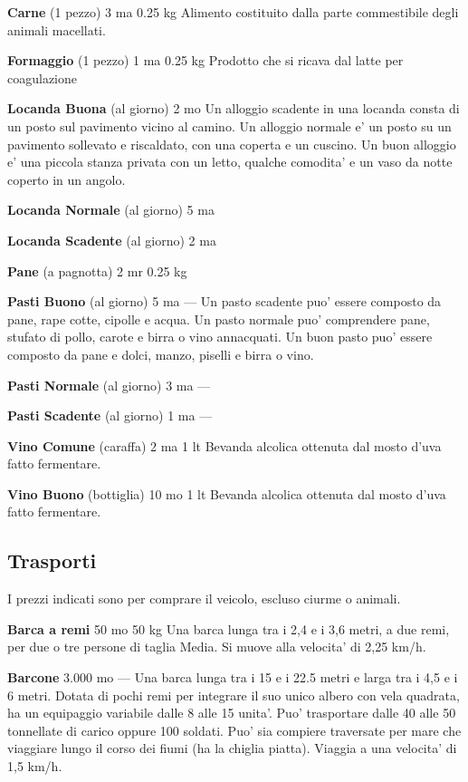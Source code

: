 \documentclass[a4paper,11pt,twoside,openany]{dndbook}
\begin{document}
{\textbf{Carne} (1 pezzo) 3 ma 0.25 kg Alimento costituito dalla parte commestibile degli animali macellati.

\textbf{Formaggio} (1 pezzo) 1 ma 0.25 kg Prodotto che si ricava dal latte per coagulazione

\textbf{Locanda Buona} (al giorno) 2 mo Un alloggio scadente in una locanda consta di un posto sul pavimento vicino al camino. Un alloggio normale e' un posto su un pavimento sollevato e riscaldato, con una coperta e un cuscino. Un buon alloggio e' una piccola stanza privata con un letto, qualche comodita' e un vaso da notte coperto in un angolo.

\textbf{Locanda Normale} (al giorno) 5 ma

\textbf{Locanda Scadente} (al giorno) 2 ma 

\textbf{Pane} (a pagnotta) 2 mr 0.25 kg

\textbf{Pasti Buono} (al giorno) 5 ma --- Un pasto scadente puo' essere composto da pane, rape cotte, cipolle e acqua. Un pasto normale puo' comprendere pane, stufato di pollo, carote e birra o vino annacquati. Un buon pasto puo' essere composto da pane e dolci, manzo, piselli e birra o vino.

\textbf{Pasti Normale} (al giorno) 3 ma ---

\textbf{Pasti Scadente} (al giorno) 1 ma ---

\textbf{Vino Comune} (caraffa) 2 ma 1 lt Bevanda alcolica ottenuta dal mosto d'uva fatto fermentare.

\textbf{Vino Buono} (bottiglia) 10 mo 1 lt Bevanda alcolica ottenuta dal mosto d'uva fatto fermentare.

\pagebreak

\subsection{Trasporti}

\label{trasporti}

I prezzi indicati sono per comprare il veicolo, escluso ciurme o animali.

\textbf{Barca a remi} 50 mo 50 kg Una barca lunga tra i 2,4 e i 3,6 metri, a due remi, per due o tre persone di taglia Media. Si muove alla velocita' di 2,25 km/h.

\textbf{Barcone} 3.000 mo --- Una barca lunga tra i 15 e i 22.5 metri e larga tra i 4,5 e i 6 metri. Dotata di pochi remi per integrare il suo unico albero con vela quadrata, ha un equipaggio variabile dalle 8 alle 15 unita'. Puo' trasportare dalle 40 alle 50 tonnellate di carico oppure 100 soldati. Puo' sia compiere traversate per mare che viaggiare lungo il corso dei fiumi (ha la chiglia piatta). Viaggia a una velocita' di 1,5 km/h.

}
\end{document}

